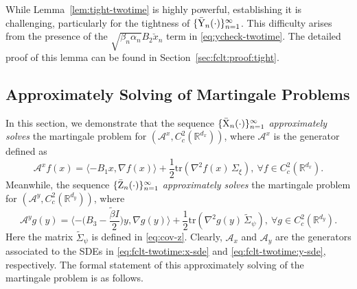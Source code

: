 \documentclass[11pt]{article}
\theoremstyle{plain}
\newtheorem{prop}{Proposition}[section]
\theoremstyle{definition}
\newcommand{\inner}[2]{\langle #1, #2 \rangle}
\def\invdiffslow{\tilde{\beta}}
\def\mI{{\bm{I}}}
\def\AM{{\mathcal A}}
\def\RB{{\mathbb R}}
\def\tr{\mathrm{tr}}
\newcommand{\xcheck}{{\check{x}}}
\newcommand{\xbar}{{\bar{\textnormal{X}}}}
\newcommand{\ybar}{{\bar{\textnormal{Y}}}}
\newcommand{\zbar}{{\bar{\textnormal{Z}}}}
\newcommand{\xx}{{x}}
\newcommand{\yy}{{y}}
\def\mI{{I}}
\begin{document}
While Lemma~\ref{lem:tight-twotime} is highly powerful, establishing it is challenging, particularly for the tightness of $\{ \ybar_{n}(\cdot) \}_{n=1}^\infty$. This difficulty arises from the presence of the $\sqrt{ \beta_{n} \alpha_{n} } B_2 \xcheck_{n}$ term in \eqref{eq:ycheck-twotime}. The detailed proof of this lemma can be found in Section~\ref{sec:fclt:proof:tight}.


\subsection{Approximately Solving of Martingale Problems}\label{sec:fclt:mart-prob}



In this section, we demonstrate that 
the sequence 
$\{ \xbar_{n}(\cdot) \}_{n=1}^\infty$
\textit{approximately solves} the martingale problem for $(\AM^x, C^2_c(\RB^{d_x}) )$, where
$\AM^x$ is the generator defined as
\begin{equation}\label{eq:generator-twotime:Lx}
	\AM^x f(\xx) = \inner{- B_1 \xx }{ \nabla f(\xx) } + \frac{1}{2} \tr( \nabla^2 f(\xx)\, \Sigma_{\xi} ), \ \forall f \in C^2_c(\RB^{d_x}).
\end{equation}
Meanwhile, the sequence $\{ \zbar_{n}(\cdot) \}_{n=1}^\infty$
\textit{approximately solves} the martingale problem for $(\AM^y, C^2_c(\RB^{d_y}) )$, where
    \begin{equation}\label{eq:generator-twotime:Ly}
	\AM^y g(\yy) = \inner{- \Big( B_3 - \frac{\invdiffslow \mI}{2} \Big) \yy }{ \nabla g(\yy) } + \frac{1}{2} \tr( \nabla^2 g(\yy)\, \tilde{\Sigma}_{\psi} ), \ \forall g \in C^2_c(\RB^{d_y}).
\end{equation}
Here the matrix $\widetilde{\Sigma}_{\psi}$ is defined in \eqref{eq:cov-z}.
Clearly, $\AM_x$ and $\AM_y$ are the generators associated to the SDEs in \eqref{eq:fclt-twotime:x-sde} and \eqref{eq:fclt-twotime:y-sde}, respectively.
The formal statement of this approximately solving of the martingale problem is as follows.
\end{document}
